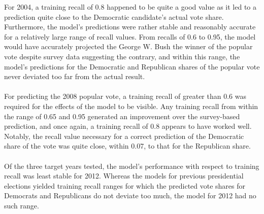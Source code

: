 \documentclass{article}
\begin{document}
	For 2004, a training recall of 0.8 happened to be quite a good value as it led to a prediction quite close to the Democratic candidate's actual vote share. Furthermore, the model's predictions were rather stable and reasonably accurate for a relatively large range of recall values. From recalls of 0.6 to 0.95, the model would have accurately projected the George W. Bush the winner of the popular vote despite survey data suggesting the contrary, and within this range, the model's predictions for the Democratic and Republican shares of the popular vote never deviated too far from the actual result.
	\\\\
	For predicting the 2008 popular vote, a training recall of greater than 0.6 was required for the effects of the model to be visible. Any training recall from within the range of 0.65 and 0.95 generated an improvement over the survey-based prediction, and once again, a training recall of 0.8 appears to have worked well. Notably, the recall value necessary for a correct prediction of the Democratic share of the vote was quite close, within 0.07, to that for the Republican share.
	\\\\
	Of the three target years tested, the model's performance with respect to training recall was least stable for 2012. Whereas the models for previous presidential elections yielded training recall ranges for which the predicted vote shares for Democrats and Republicans do not deviate too much, the model for 2012 had no such range.
	
\end{document}
